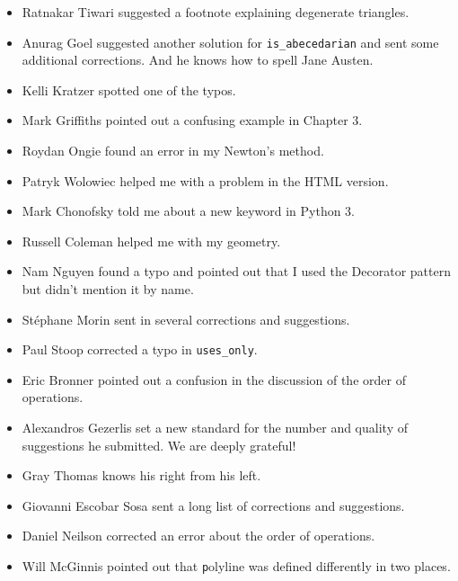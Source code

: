 \documentclass[
DIV=11,
fontsize=13,
twoside,
headinclude=false,
titlepage=firstiscover,
abstract=true,
headsepline=true,
footsepline=true,
chapterprefix=true, %
headings=big,
bibliography=totoc,%
captions=tableheading
]{scrbook}
\theoremstyle{definition}
\begin{document}
\begin{itemize}
\item Ratnakar Tiwari suggested a footnote explaining degenerate
triangles.

\item Anurag Goel suggested another solution for \verb"is_abecedarian"
and sent some additional corrections.  And he knows how to
spell Jane Austen.

\item Kelli Kratzer spotted one of the typos.

\item Mark Griffiths pointed out a confusing example in Chapter 3.

\item Roydan Ongie found an error in my Newton's method.

\item Patryk Wolowiec helped me with a problem in the HTML version.

\item Mark Chonofsky told me about a new keyword in Python 3.

\item Russell Coleman helped me with my geometry.

\item Nam Nguyen found a typo and pointed out that I used the Decorator
pattern but didn't mention it by name.

\item St\'{e}phane Morin sent in several corrections and suggestions.

\item Paul Stoop corrected a typo in \verb+uses_only+.

\item Eric Bronner pointed out a confusion in the discussion of the
order of operations.

\item Alexandros Gezerlis set a new standard for the number and
quality of suggestions he submitted.  We are deeply grateful!

\item Gray Thomas knows his right from his left.

\item Giovanni Escobar Sosa sent a long list of corrections and
suggestions.

\item Daniel Neilson corrected an error about the order of operations.

\item Will McGinnis pointed out that {\texttt polyline} was defined
differently in two places.


\end{itemize}
\end{document}
